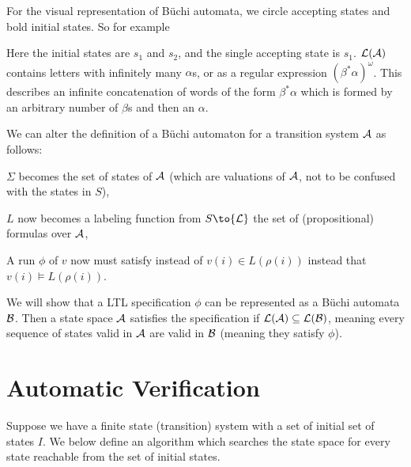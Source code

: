For the visual representation of B\"uchi automata, we circle accepting states and bold initial states.
So for example

\bigskip
\centerline{}
\bigskip

Here the initial states are $s_1$ and $s_2$, and the single accepting state is $s_1$.
${\cal L}({\cal A})$ contains letters with infinitely many $\alpha$s, or as a regular expression $(\beta^*\alpha)^\omega$.
This describes an infinite concatenation of words of the form $\beta^*\alpha$ which is formed by an arbitrary number of $\beta$s and then an $\alpha$.

We can alter the definition of a B\"uchi automaton for a transition system ${\cal A}$ as follows:
\benum
    \item $\Sigma$ becomes the set of states of ${\cal A}$ (which are valuations of ${\cal A}$, not to be confused with the states in $S$),
    \item $L$ now becomes a labeling function from $S\to{\cal L}$ the set of (propositional) formulas over ${\cal A}$,
    \item A run $\phi$ of $v$ now must satisfy instead of $v(i)\in L(\rho(i))$ instead that $v(i)\vDash L(\rho(i))$.
\eenum

We will show that a LTL specification $\phi$ can be represented as a B\"uchi automata ${\cal B}$.
Then a state space ${\cal A}$ satisfies the specification if ${\cal L}({\cal A})\subseteq{\cal L}({\cal B})$, meaning every sequence of states valid in ${\cal A}$ are valid in ${\cal B}$ (meaning they
satisfy $\phi$).

\vfill\break
\section{Automatic Verification}

Suppose we have a finite state (transition) system with a set of initial set of states $I$.
We below define an algorithm which searches the state space for every state reachable from the set of initial states.

